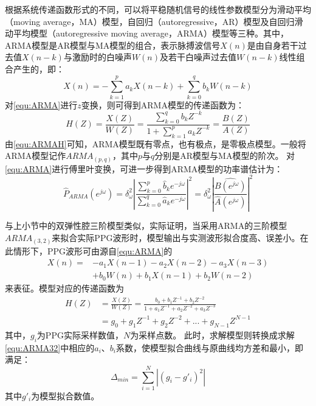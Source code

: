 根据系统传递函数形式的不同，可以将平稳随机信号的线性参数模型分为滑动平均（moving average，MA）模型，自回归（autoregressive，AR）模型及自回归滑动平均模型（autoregressive moving average，ARMA）模型等三种。其中，
ARMA模型是AR模型与MA模型的组合，表示脉搏波信号$X(n)$是由自身若干过去值$X(n-k)$与激励时的白噪声$W(n)$及若干白噪声过去值$W(n-k)$线性组合产生的，即：
\begin{equation}
    \label{equ:ARMA}
    X(n)=-\sum_{k=1}^{p}a_{k}X(n-k)+\sum_{k=0}^{q}b_{k}W(n-k)
\end{equation}
对\autoref{equ:ARMA}进行$z$变换，则可得到ARMA模型的传递函数为：
\begin{equation}
    \label{equ:ARMAH}
    H(Z)=\frac{X(Z)}{W(Z)}=\frac{\sum_{k=0}^{q}b_{k}Z^{-k}}{1+\sum_{k=1}^{p}a_{k}Z^{-k}}=\frac{B(Z)}{A(Z)}
\end{equation}
由\autoref{equ:ARMAH}可知，ARMA模型既有零点，也有极点，是零极点模型。一般将ARMA模型记作$ARMA_{(p,q)}$，其中$p$与$q$分别是AR模型与MA模型的阶次。
对\autoref{equ:ARMA}进行傅里叶变换，可进一步得到ARMA模型的功率谱估计为\cite{Qiu2012}：
\begin{equation}
    \label{equ:ARMAP}
    \hat{P}_{ARMA}(e^{j\omega} )=
    \delta _{\omega}^2\left |  \frac{\sum_{k=0}^{p}\hat{b}_{k}e^{-j\omega}}{\sum_{k=0}^{q}\hat{a}_{k}e^{-j\omega}}\right |^2
    =\delta _{\omega}^2\left |  \frac{\hat{B(e^{j\omega} )}}{\hat{A}(e^{j\omega} )}\right |^2
\end{equation}

与上小节中的双弹性腔三阶模型类似，实际证明，当采用ARMA的三阶模型$ARMA_{(3,2)}$来拟合实际PPG波形时，模型输出与实测波形拟合度高、误差小\cite{PPGYY}。在此情形下，PPG波形可由源自\autoref{equ:ARMA}的
\begin{equation}
    \label{equ:ARMA32}
    \begin{aligned}
        X(n)=&-a_{1}X(n-1)-a_{2}X(n-2)-a_{3}X(n-3)\\
        &+b_{0}W(n)+b_{1}X(n-1)+b_{2}W(n-2)
    \end{aligned}
\end{equation}
来表征。模型对应的传递函数为
\begin{equation}
    \label{equ:ARMAH32}
    \begin{aligned}
        H(Z)&=\frac{X(Z)}{W(Z)}=\frac{b_{0}+b_{1}Z^{-1}+b_{2}Z^{-2}}{1+a_{1}Z^{-1}+a_{2}Z^{-2}+a_{3}Z^{-3}}\\
        &=g_{0}+g_{1}Z^{-1}+g_{2}Z^{-2}+...+g_{N-1}Z^{N-1}
    \end{aligned}
\end{equation}
其中，$g_{i}$为PPG实际采样数值，$N$为采样点数。
此时，求解模型则转换成求解\autoref{equ:ARMA32}中相应的$a_{i}$、$b_{i}$系数，使模型拟合曲线与原曲线均方差和最小，即满足：
\begin{equation}
    \label{equ:MeanSum}
    \Delta_{min}=\sum_{i=1}^{N}\left |  (g_i-g'_i)^2\right |
\end{equation}
其中$g'_i$为模型拟合数值。


